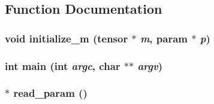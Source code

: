 \subsection{Function Documentation}
\hypertarget{main-ben_8cpp_ac6cbfe6927d30143f6bac0e7be47e496}{
\subsubsection[{initialize\_\-m}]{\setlength{\rightskip}{0pt plus 5cm}void initialize\_\-m ({\bf tensor} $\ast$ {\em m}, \/  {\bf param} $\ast$ {\em p})}}
\label{main-ben_8cpp_ac6cbfe6927d30143f6bac0e7be47e496}
\hypertarget{main-ben_8cpp_a3c04138a5bfe5d72780bb7e82a18e627}{
\subsubsection[{main}]{\setlength{\rightskip}{0pt plus 5cm}int main (int {\em argc}, \/  char $\ast$$\ast$ {\em argv})}}
\label{main-ben_8cpp_a3c04138a5bfe5d72780bb7e82a18e627}
\hypertarget{main-ben_8cpp_acf175bfd69504d2109bb5f4fafc34125}{
\subsubsection[{read\_\-param}]{$\ast$ read\_\-param ()}}
\label{main-ben_8cpp_acf175bfd69504d2109bb5f4fafc34125}
